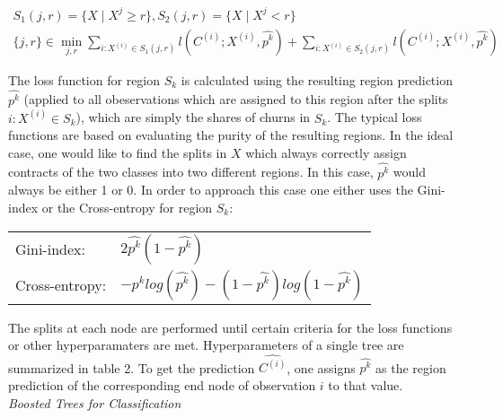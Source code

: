 \documentclass[12pt,titlepage]{article}
\begin{document}
\begin{equation} \label{dec_tree}
    \begin{aligned}
        S_{1}(j, r) = \{X\mid X^{j}\geq r\} , S_{2}(j, r) = \{X\mid X^{j}< r\} \\
        \{j, r\} \in \min_{j, r} \sum_{i:X^{(i)}\in S_{1}(j, r)}l(C^{(i)}; X^{(i)}, \widehat{p^{k}}) + \sum_{i:X^{(i)}\in S_{2}(j, r)}l(C^{(i)}; X^{(i)}, \widehat{p^{k}})
    \end{aligned}
\end{equation}

The loss function for region $S_{k}$ is calculated using the resulting region prediction $\widehat{p^{k}}$ (applied to all obeservations which are assigned to this region after the splits $i:X^{(i)}\in S_{k}$), which are simply the shares of churns in $S_{k}$. The typical loss functions are based on evaluating the purity of the resulting regions. In the ideal case, one would like to find the splits in $X$ which always correctly assign contracts of the two classes into two different regions. In this case, $\widehat{p^{k}}$ would always be either 1 or 0. In order to approach this case one either uses the Gini-index or the Cross-entropy for region $S_{k}$: \\

\begin{center}
    \begin{tabular}{ll}
        Gini-index: & $2\widehat{p^{k}}(1-\widehat{p^{k}})$ \\
        Cross-entropy: & $-\widehat{p^{k}}log(\widehat{p^{k}}) - (1-\widehat{p^{k}})log(1-\widehat{p^{k}})$ \\
    \end{tabular}
\end{center}

The splits at each node are performed until certain criteria for the loss functions or other hyperparamaters are met. Hyperparameters of a single tree are summarized in table 2. To get the prediction $\widehat{C^{(i)}}$, one assigns $\widehat{p^{k}}$ as the region prediction of the corresponding end node of observation $i$ to that value. \\

\textit{Boosted Trees for Classification}
\end{document}
